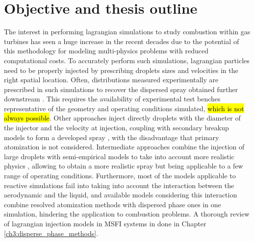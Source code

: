 \clearpage

\section{Objective and thesis outline}
\label{sec:ch1_objective_thesis_outline}

The interest in performing lagrangian simulations to study combustion within gas turbines has seen a huge increase in the recent decades due to the potential of this methodology for modeling multi-physics problems with reduced computational costs. To accurately perform such simulations, lagrangian particles need to be properly injected by prescribing droplets sizes and velocities in the right spatial location. Often, distributions measured experimentally are prescribed in such simulations to recover the dispersed spray obtained further downstream . This requires the availability of experimental test benches representative of the geometry and operating conditions simulated, \hl{which is not always possible}. Other approaches inject directly droplets with the diameter of the injector and the velocity at injection, coupling with secondary breakup models to form a developed spray , with the disadvantage that primary atomization is not considered. Intermediate approaches combine the injection of large droplets with semi-empirical models to take into account more realistic physics , allowing to obtain a more realistic spray but being applicable to a few range of operating conditions. Furthermore, most of the models applicable to reactive simulations fail into taking into account the interaction between the aerodynamic and the liquid, and available models considering this interaction  combine resolved atomization methods with dispersed phase ones in one simulation, hindering the application to combustion problems. A thorough review of lagrangian injection models in MSFI systems in done in Chapter \ref{ch3:disperse_phase_methods}.

